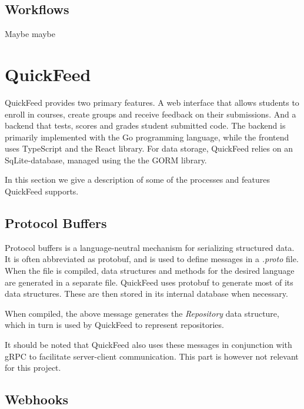 \subsection{Workflows}

Maybe maybe

\section{QuickFeed}

QuickFeed provides two primary features.
A web interface that allows students to enroll in courses, create groups and receive feedback on their submissions.
And a backend that tests, scores and grades student submitted code.
The backend is primarily implemented with the Go programming language, while the frontend uses TypeScript and the React library.
For data storage, QuickFeed relies on an SqLite-database, managed using the the GORM library.

In this section we give a description of some of the processes and features QuickFeed supports.

\subsection{Protocol Buffers}

Protocol buffers is a language-neutral mechanism for serializing structured data. %
It is often abbreviated as protobuf, and is used to define messages in a \textit{.proto} file.
When the file is compiled, data structures and methods for the desired language are generated in a separate file.
QuickFeed uses protobuf to generate most of its data structures.
These are then stored in its internal database when necessary.



When compiled, the above message generates the \textit{Repository} data structure, which in turn is used by QuickFeed to represent repositories.

It should be noted that QuickFeed also uses these messages in conjunction with gRPC to facilitate server-client communication.
This part is however not relevant for this project.

\subsection{Webhooks}
\label{sec:webhooks}

